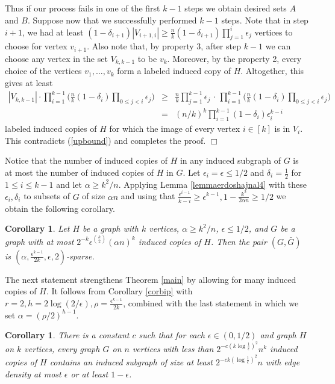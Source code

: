 \documentclass[11pt]{article}
\newenvironment{proof}
      {\medskip\noindent{\bf Proof.}\hspace{1mm}}
      {\hfill$\Box$\medskip}
\newtheorem{corollary}[theorem]{Corollary}
\begin{document}
\begin{proof}
Thus if our process fails in one of the first $k-1$ steps we obtain desired sets $A$ and $B$.
Suppose now that we successfully performed $k-1$ steps. Note that in step $i+1$, we had at least $(1-\delta_{i+1})|V_{i+1,i}| \geq
\frac{n}{k}(1-\delta_{i+1})\prod_{j=1}^i \epsilon_j$ vertices to choose for vertex $v_{i+1}$. Also note that, by property 3, after step $k-1$
we can choose any vertex in the set $V_{k,k-1}$ to be $v_k$. Moreover, by the property 2, every choice of the vertices $v_1, \ldots, v_k$ form a
labeled induced copy of $H$. Altogether, this gives at least
\begin{eqnarray*}
|V_{k,k-1}| \cdot \prod_{i=1}^{k-1}\bigg( \frac{n}{k}(1-\delta_{i})\prod_{0 \leq j<i}
\epsilon_j\bigg) &\geq& \frac{n}{k}\prod_{j=1}^{k-1}\epsilon_j \, \cdot \,
\prod_{i=1}^{k-1}\bigg( \frac{n}{k}(1-\delta_{i})\prod_{0 \leq j<i}
\epsilon_j\bigg)\\
&=&(n/k)^k\prod_{i=1}^{k-1}(1-\delta_i)\epsilon_i^{k-i}
\end{eqnarray*}
labeled induced copies of $H$ for which the image of every vertex $i \in [k]$ is in $V_i$.
This contradicts (\ref{upbound}) and completes the proof.
\end{proof}

Notice that the number of induced copies of $H$ in any induced
subgraph of $G$ is at most the number of induced copies of $H$ in
$G$. Let $\epsilon_i=\epsilon\leq 1/2$ and $\delta_i=\frac{1}{2}$
for $1 \leq i \leq k-1$ and let $\alpha \geq k^2/n$. Applying Lemma
\ref{lemmaerdoshajnal4} with these $\epsilon_i, \delta_i$ to subsets
of $G$ of size $\alpha n$ and using that $\frac{\epsilon^{i-1}}{k-i}
\geq \epsilon^{k-1}, 1-\frac{k^2}{2\alpha n}\geq 1/2$ we obtain the
following corollary.

\begin{corollary}\label{last6}
Let $H$ be a graph with $k$ vertices, $\alpha \geq k^2/n$, $\epsilon
\leq 1/2$, and $G$ be a graph with at most $2^{-k}\epsilon^{k
\choose 2}(\alpha n)^{k}$ induced copies of $H$. Then the pair $(G,
\bar G)$ is $(\alpha,\frac{\epsilon^{k-1}}{2k},\epsilon,2)$-sparse.
\end{corollary}

The next statement strengthens Theorem
\ref{main} by allowing for many induced copies of $H$.
It follows from Corollary \ref{corbip} with $r=2, h=2\log (2/\epsilon),
\rho=\frac{\epsilon^{k-1}}{2k}$,
combined with the last statement in which we set $\alpha=(\rho/2)^{h-1}$.

\begin{corollary}\label{maingeneralized7}
There is a constant $c$ such that for each $\epsilon \in (0,1/2)$
and graph $H$ on $k$ vertices, every graph $G$ on $n$ vertices with less than
$2^{-c(k \log \frac{1}{\epsilon})^2}n^k$ induced copies of
$H$ contains an induced subgraph of size at least $2^{-ck (\log
\frac{1}{\epsilon})^2}n$ with edge density at most $\epsilon$ or at
least $1-\epsilon$.
\end{corollary}
\end{document}
